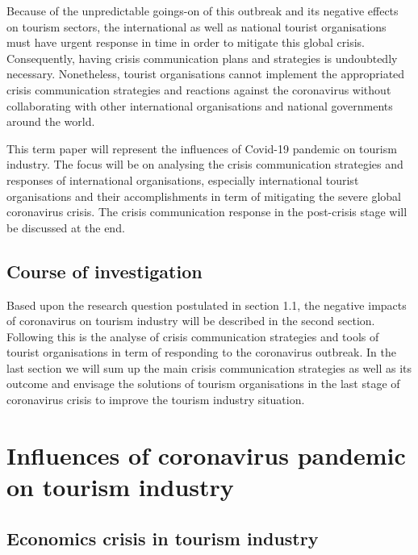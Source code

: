 \documentclass[draft=false
              ,paper=a4
              ,twoside=false
              ,fontsize=12pt
              ,headsepline
              ,BCOR10mm
              ,DIV11
              ]{scrbook}
\begin{document}
Because of the unpredictable goings-on of this outbreak and its negative effects on tourism sectors, the international as well as national tourist organisations must have urgent response in time in order to mitigate this global crisis. Consequently, having  crisis communication plans and strategies is undoubtedly necessary. Nonetheless, tourist organisations cannot implement the appropriated crisis communication strategies and reactions against the coronavirus without collaborating with other international organisations and national governments around the world.

This term paper will represent the influences of Covid-19 pandemic on tourism industry. The focus will be on analysing the crisis communication strategies and responses of international organisations, especially international tourist organisations and their accomplishments  in term of mitigating the severe global coronavirus crisis. The crisis communication response in the post-crisis stage will be discussed at the end.

\vspace{12pt}
\section{Course of investigation}
\vspace{6pt}

Based upon the research question postulated in section 1.1, the negative impacts of coronavirus on tourism industry will be described in the second section. Following this is the analyse of crisis communication strategies and tools of tourist organisations in term of responding to the coronavirus outbreak. In the last section we will sum up the main crisis communication strategies as well as its outcome and envisage the solutions of tourism organisations in the last stage of coronavirus crisis to improve the tourism industry situation.

\vspace{12pt}
\chapter{Influences of coronavirus pandemic on tourism industry}
\vspace{6pt}
\section{Economics crisis in tourism industry}
\vspace{6pt}
\end{document}
